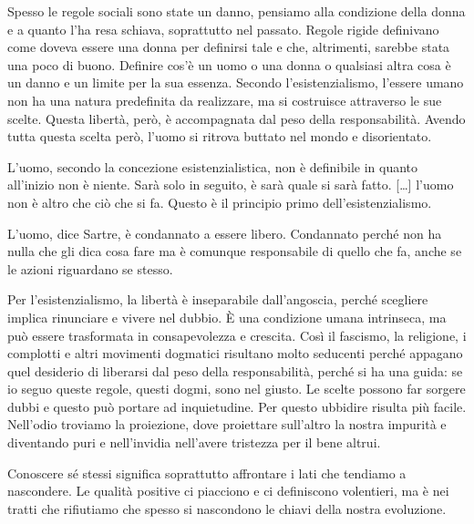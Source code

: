 \documentclass[12pt]{book} %
\begin{document}
Spesso le regole sociali sono state un danno, pensiamo alla condizione della donna e a quanto l'ha resa schiava,
soprattutto nel passato. Regole rigide definivano come doveva essere una donna per definirsi tale e che, altrimenti,
sarebbe stata una poco di buono. Definire cos'è un uomo o una donna o qualsiasi altra cosa è un danno e un limite per
la sua essenza. Secondo l’esistenzialismo, l’essere umano non ha una natura predefinita da realizzare, ma si costruisce attraverso le sue scelte. Questa libertà, però, è accompagnata dal peso della responsabilità. Avendo tutta questa scelta però, l'uomo
si ritrova buttato nel mondo e disorientato.

L'uomo, secondo la concezione esistenzialistica, non è definibile in quanto all'inizio non è niente. Sarà solo in
seguito, è sarà quale si sarà fatto. […] l'uomo non è altro che ciò che si fa. Questo è il principio primo
dell'esistenzialismo.

L'uomo, dice Sartre, è condannato a essere libero. Condannato perché non ha nulla che gli dica cosa fare ma è comunque
responsabile di quello che fa, anche se le azioni riguardano se stesso.

Per l’esistenzialismo, la libertà è inseparabile dall’angoscia, perché scegliere implica rinunciare e vivere nel dubbio. È una condizione umana intrinseca, ma può essere trasformata in consapevolezza e crescita. Così il fascismo, la religione, i complotti e
altri movimenti dogmatici risultano molto seducenti perché appagano quel desiderio di liberarsi dal peso della
responsabilità, perché si ha una guida: se io seguo queste regole, questi dogmi, sono nel giusto. Le scelte
possono far sorgere dubbi e questo può portare ad inquietudine. Per questo ubbidire risulta più facile. Nell'odio troviamo la
proiezione, dove proiettare sull'altro la nostra impurità e diventando puri e nell'invidia
nell'avere tristezza per il bene altrui.

Conoscere sé stessi significa soprattutto affrontare i lati che tendiamo a nascondere. Le qualità positive ci piacciono e ci definiscono volentieri, ma è nei tratti che rifiutiamo che spesso si nascondono le chiavi della nostra evoluzione.
\end{document}
